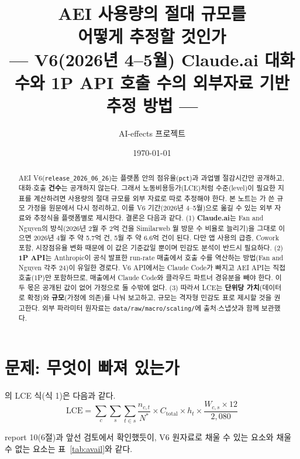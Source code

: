 \documentclass[11pt]{article}
\title{AEI 사용량의 절대 규모를\\[1mm]
어떻게 추정할 것인가\\[2mm]
\large --- V6(2026년 4--5월) Claude.ai 대화 수와 1P API 호출 수의 외부자료 기반 추정 방법 ---}
\author{AI-effects 프로젝트}
\date{\today}
\begin{document}
\maketitle

\begin{abstract}
\noindent AEI V6(\texttt{release\_2026\_06\_26})는 플랫폼 안의 점유율(\texttt{pct})과 과업별 절감시간만 공개하고, 대화$\cdot$호출 \textbf{건수}는 공개하지 않는다. 그래서 노동비용등가(LCE)처럼 수준(level)이 필요한 지표를 계산하려면 사용량의 절대 규모를 외부 자료로 따로 추정해야 한다. 본 노트는 \textcite{fan-2026-aggregate-gains-from-ai}가 쓴 규모 가정을 원문에서 다시 정리하고, 이를 V6 기간(2026년 4--5월)으로 옮길 수 있는 외부 자료와 추정식을 플랫폼별로 제시한다. 결론은 다음과 같다. (1) \textbf{Claude.ai}는 Fan and Nguyen의 방식(2026년 2월 주 2억 건을 Similarweb 월 방문 수 비율로 늘리기)을 그대로 이으면 2026년 4월 주 약 5.7억 건, 5월 주 약 6.6억 건이 된다. 다만 앱 사용의 급증, Cowork 포함, 시장점유율 변화 때문에 이 값은 기준값일 뿐이며 민감도 분석이 반드시 필요하다. (2) \textbf{1P API}는 Anthropic이 공식 발표한 run-rate 매출에서 호출 수를 역산하는 방법(Fan and Nguyen 각주 24)이 유일한 경로다. V6 API에서는 Claude Code가 빠지고 AEI API는 직접 호출(1P)만 포함하므로, 매출에서 Claude Code와 클라우드 파트너 경유분을 빼야 한다. 이 두 몫은 공개된 값이 없어 가정으로 둘 수밖에 없다. (3) 따라서 LCE는 \textbf{단위당 가치}(데이터로 확정)와 \textbf{규모}(가정에 의존)를 나눠 보고하고, 규모는 격자형 민감도 표로 제시할 것을 권고한다. 외부 파라미터 원자료는 \texttt{data/raw/macro/scaling/}에 출처$\cdot$스냅샷과 함께 보관했다.
\end{abstract}

\tableofcontents

\section{문제: 무엇이 빠져 있는가}

\textcite{fan-2026-aggregate-gains-from-ai}의 LCE 식(식 1)은 다음과 같다.
\begin{equation*}
\text{LCE} = \sum_c \sum_s \sum_{t\in s} \frac{n_{c,t}}{N^*}\times C_{\text{total}} \times h_t \times \frac{W_{c,s}\times 12}{2{,}080}
\end{equation*}

report 10(6절)과 앞선 검토에서 확인했듯이, V6 원자료로 채울 수 있는 요소와 채울 수 없는 요소는 표~\ref{tab:avail}와 같다.
\end{document}
